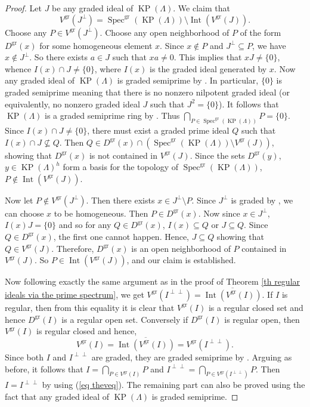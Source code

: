 \documentclass[a4paper,reqno,12pt]{amsart}
\numberwithin{equation}{section}
\theoremstyle{definition}
\theoremstyle{remark}
\newcommand{\Spec}{\operatorname{Spec}}
\newcommand{\Int}{\operatorname{Int}}
\newcommand{\gr}{\operatorname{gr}}
\newcommand{\KP}{\operatorname{KP}}
\begin{document}
\begin{proof}
Let $J$ be any graded ideal of $\KP(\Lambda)$. We claim that \[V^{\gr}(J^\perp)=\Spec^{\gr}(\KP(\Lambda))\setminus \Int(V^{\gr}(J)).\] Choose any $P\in V^{\gr}(J^\perp)$. Choose any open neighborhood of $P$ of the form $D^{\gr}(x)$ for some homogeneous element $x$. Since $x\notin P$ and $J^\perp \subseteq P$, we have $x\notin J^\perp$. So there exists $a\in J$ such that $xa\neq 0$. This implies that $xJ\neq \{0\}$, whence $I(x)\cap J\neq \{0\}$, where $I(x)$ is the graded ideal generated by $x$. Now any graded ideal of $\KP(\Lambda)$ is graded semiprime by \cite[Theorem 6.5(3)]{AHLS}. In particular, $\{0\}$ is graded semiprime meaning that there is no nonzero nilpotent graded ideal (or equivalently, no nonzero graded ideal $J$ such that $J^2=\{0\}$). It follows that $\KP(\Lambda)$ is a graded semiprime ring by \cite[\S 2.11]{NOgraded}. Thus $\displaystyle{\bigcap_{P\in \Spec^{\gr}(\KP(\Lambda))}}P=\{0\}$. Since $I(x)\cap J\neq \{0\}$, there must exist a graded prime ideal $Q$ such that $I(x)\cap J\nsubseteq Q$. Then $Q\in D^{\gr}(x)\cap (\Spec^{\gr}(\KP(\Lambda))\setminus V^{\gr}(J))$, showing that $D^{\gr}(x)$ is not contained in $V^{\gr}(J)$. Since the sets $D^{\gr}(y)$, $y\in \KP(\Lambda)^h$ form a basis for the topology of $\Spec^{\gr}(\KP(\Lambda))$, $P\notin \Int(V^{\gr}(J))$. 

Now let $P\notin V^{\gr}(J^\perp)$. Then there exists $x\in J^\perp \setminus P$. Since $J^\perp$ is graded by \cite[Lemma 4.2]{Schenkel}, we can choose $x$ to be homogeneous. Then $P\in D^{\gr}(x)$. Now since $x\in J^\perp$, $I(x)J=\{0\}$ and so for any $Q\in D^{\gr}(x)$, $I(x)\subseteq Q$ or $J\subseteq Q$. Since $Q\in D^{\gr}(x)$, the first one cannot happen. Hence, $J\subseteq Q$ showing that $Q\in V^{\gr}(J)$. Therefore, $D^{\gr}(x)$ is an open neighborhood of $P$ contained in $V^{\gr}(J)$. So $P\in \Int(V^{\gr}(J))$, and our claim is established.

Now following exactly the same argument as in the proof of Theorem \ref{th regular ideals via the prime spectrum}, we get $V^{\gr}(I^{\perp \perp})=\overline{\Int(V^{\gr}(I))}$. If $I$ is regular, then from this equality it is clear that $V^{\gr}(I)$ is a regular closed set and hence $D^{\gr}(I)$ is a regular open set. Conversely if $D^{\gr}(I)$ is regular open, then $V^{\gr}(I)$ is regular closed and hence, 
\begin{equation}\label{eq theveq}
V^{\gr}(I)=\overline{\Int(V^{\gr}(I))}=V^{\gr}(I^{\perp\perp}).    
\end{equation}
Since both $I$ and $I^{\perp\perp}$ are graded, they are graded semiprime by \cite[Theorem 6.5(3)]{AHLS}. Arguing as before, it follows that $I=\displaystyle{\bigcap_{P\in V^{\gr}(I)}}P$ and $I^{\perp\perp}=\displaystyle{\bigcap_{P\in V^{\gr}(I^{\perp\perp})}}P$. Then $I=I^{\perp\perp}$ by using (\ref{eq theveq}). The remaining part can also be proved using the fact that any graded ideal of $\KP(\Lambda)$ is graded semiprime.
\end{proof}
\end{document}
